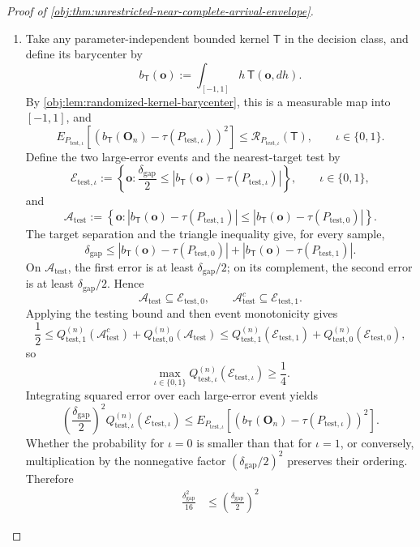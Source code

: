 \begin{proof}[Proof of \cref{obj:thm:unrestricted-near-complete-arrival-envelope}]
\begin{enumerate}
\item Take any parameter-independent bounded kernel \(\mathsf T\) in the decision class, and define its barycenter by
\[
b_{\mathsf T}(\mathbf o)
:=
\int_{[-1,1]}h\,\mathsf T(\mathbf o,dh).
\]
By \cref{obj:lem:randomized-kernel-barycenter}, this is a measurable map into \([-1,1]\), and
\[
E_{P_{\mathrm{test},\iota}}\!\left[
\left(b_{\mathsf T}(\mathbf O_n)-\tau(P_{\mathrm{test},\iota})\right)^2
\right]
\le
\mathcal R_{P_{\mathrm{test},\iota}}(\mathsf T),
\qquad \iota\in\{0,1\}.
\]
Define the two large-error events and the nearest-target test by
\[
\mathcal E_{\mathrm{test},\iota}
:=
\left\{\mathbf o:
\frac{\delta_{\mathrm{gap}}}{2}
\le
\left|b_{\mathsf T}(\mathbf o)-\tau(P_{\mathrm{test},\iota})\right|
\right\},
\qquad \iota\in\{0,1\},
\]
and
\[
\mathcal A_{\mathrm{test}}
:=
\left\{\mathbf o:
\left|b_{\mathsf T}(\mathbf o)-\tau(P_{\mathrm{test},1})\right|
\le
\left|b_{\mathsf T}(\mathbf o)-\tau(P_{\mathrm{test},0})\right|
\right\}.
\]
The target separation and the triangle inequality give, for every sample,
\[
\delta_{\mathrm{gap}}
\le
\left|b_{\mathsf T}(\mathbf o)-\tau(P_{\mathrm{test},0})\right|
+
\left|b_{\mathsf T}(\mathbf o)-\tau(P_{\mathrm{test},1})\right|.
\]
On \(\mathcal A_{\mathrm{test}}\), the first error is at least
\(\delta_{\mathrm{gap}}/2\); on its complement, the second error is at least
\(\delta_{\mathrm{gap}}/2\). Hence
\[
\mathcal A_{\mathrm{test}}\subseteq\mathcal E_{\mathrm{test},0},
\qquad
\mathcal A_{\mathrm{test}}^c\subseteq\mathcal E_{\mathrm{test},1}.
\]
Applying the testing bound and then event monotonicity gives
\[
\frac12
\le
Q_{\mathrm{test},1}^{(n)}(\mathcal A_{\mathrm{test}}^c)
+
Q_{\mathrm{test},0}^{(n)}(\mathcal A_{\mathrm{test}})
\le
Q_{\mathrm{test},1}^{(n)}(\mathcal E_{\mathrm{test},1})
+
Q_{\mathrm{test},0}^{(n)}(\mathcal E_{\mathrm{test},0}),
\]
so
\[
\max_{\iota\in\{0,1\}}
Q_{\mathrm{test},\iota}^{(n)}(\mathcal E_{\mathrm{test},\iota})
\ge\frac14.
\]
Integrating squared error over each large-error event yields
\[
\left(\frac{\delta_{\mathrm{gap}}}{2}\right)^2
Q_{\mathrm{test},\iota}^{(n)}(\mathcal E_{\mathrm{test},\iota})
\le
E_{P_{\mathrm{test},\iota}}\!\left[
\left(b_{\mathsf T}(\mathbf O_n)-\tau(P_{\mathrm{test},\iota})\right)^2
\right].
\]
Whether the probability for \(\iota=0\) is smaller than that for \(\iota=1\), or conversely, multiplication by the nonnegative factor
\((\delta_{\mathrm{gap}}/2)^2\) preserves their ordering. Therefore
\[
\begin{aligned}
\frac{\delta_{\mathrm{gap}}^2}{16}
&\le
\left(\frac{\delta_{\mathrm{gap}}}{2}\right)^2

\end{aligned}\]
\end{enumerate}
\end{proof}

